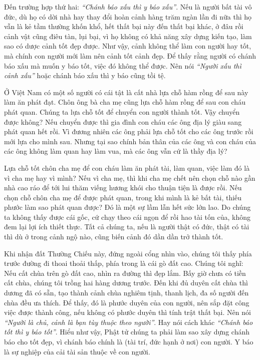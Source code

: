 \documentclass[
  12pt,
  oneside]{book}
\begin{document}
Đến trường hợp thứ hai: \emph{``Chánh báo xấu thì y báo xấu''}. Nếu là người bất tài vô đức, dù họ có dời nhà hay thay đổi hoàn cảnh hàng trăm ngàn lần đi nữa thì họ vẫn là kẻ tầm thường khốn khổ, hết thất bại này đến thất bại khác, ở đâu rồi cảnh vật cũng điêu tàn, lụi bại, vì họ không có khả năng xây dựng kiến tạo, làm sao có dược cảnh tốt đẹp được. Như vậy, cảnh không thể làm con người hay tốt, mà chính con người mới làm nên cảnh tốt cảnh đẹp. Để thấy rằng người có chánh báo xấu mà muốn y báo tốt, việc đó không thể được. Nên nói \emph{``Người xấu thì cảnh xấu''} hoặc chánh báo xấu thì y báo cũng tồi tệ.

Ở Việt Nam có một số người có cái tật là cất nhà lựa chỗ hàm rồng để sau này làm ăn phát đạt. Chôn ông bà cha mẹ cũng lựa chỗ hàm rồng để sau con cháu phát quan. Chúng ta lựa chỗ tốt để chuyển con người thành tốt. Vậy chuyển được không? Nếu chuyển được thì gia đình con cháu các ông địa lý giàu sang phát quan hết rồi. Vì đương nhiên các ông phải lựa chỗ tốt cho các ông trước rồi mới lựa cho mình sau. Nhưng tại sao chính bản thân của các ông và con cháu của các ông không làm quan hay làm vua, mà các ông vẫn cứ là thầy địa lý?

Lựa chỗ tốt chôn cha mẹ để con cháu làm ăn phát tài, làm quan, việc làm đó là vì cha mẹ hay vì mình? Nếu vì cha mẹ, thì khi cha mẹ chết nên chọn chỗ nào gần nhà cao ráo để tới lui thăm viếng hương khói cho thuận tiện là được rồi. Nếu chọn chỗ chôn cha mẹ để được phát quan, trong khi mình là kẻ bất tài, thiếu phước làm sao phát quan được? Đó là một sự lầm lẫn hết sức lớn lao. Do chúng ta không thấy được cái gốc, cứ chạy theo cái ngọn để rồi hao tài tốn của, không đem lại lợi ích thiết thực. Tất cả chúng ta, nếu là người thật có đức, thật có tài thì dù ở trong cảnh ngộ nào, cũng biến cảnh đó dần dần trở thành tốt.

Khi nhận đất Thường Chiếu này, đứng ngoài cổng nhìn vào, chúng tôi thấy phía trước đường đi thoai thoải thấp, phía trong là cái gò đất cao. Chúng tôi nghĩ: Nếu cất chùa trên gò đất cao, nhìn ra đường thì đẹp lắm. Bấy giờ chưa có tiền cất chùa, chúng tôi trồng hai hàng dương trước. Đến khi đủ duyên cất chùa thì dương đã có sẵn, tạo thành cảnh chùa nghiêm tịnh, thanh lịch, đa số người đến chùa đều ưa thích. Để thấy, đó là phước duyên của con người, nên sắp đặt công việc được thành công, nếu không có phước duyên thì tính trật thất bại. Nên nói \emph{``Người là chủ, cảnh là bạn tùy thuộc theo người''}. Hay nói cách khác \emph{``Chánh báo tốt thì y báo tốt''}. Hiểu như vậy, Phật tử chúng ta phải làm sao xây dựng chánh báo cho tốt đẹp, vì chánh báo chính là (tài trí, đức hạnh ở nơi) con người. Y báo là sự nghiệp của cải tài sản thuộc về con người.
\end{document}

